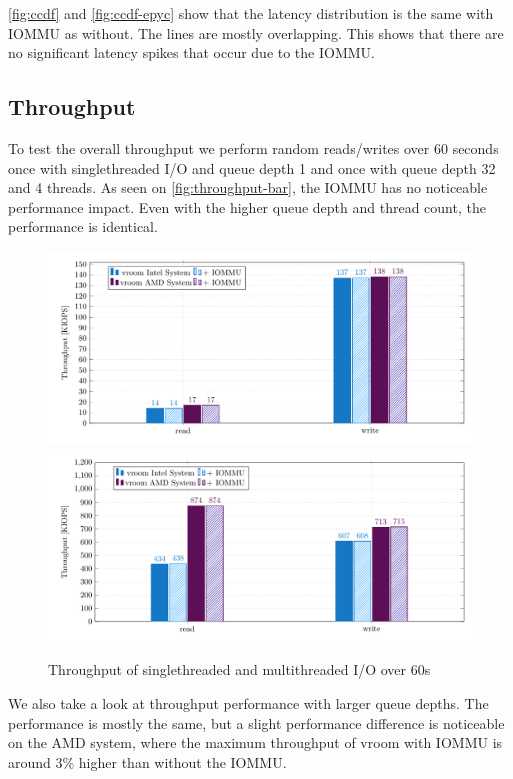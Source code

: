 \autoref{fig:ccdf} and \autoref{fig:ccdf-epyc} show that the latency distribution is the same with IOMMU as without. The lines are mostly overlapping. This shows that there are no significant latency spikes that occur due to the IOMMU.

\subsection{Throughput}
To test the overall throughput we perform random reads/writes over 60 seconds once with singlethreaded I/O and queue depth 1 and once with queue depth 32 and 4 threads. As seen on \autoref{fig:throughput-bar}, the IOMMU has no noticeable performance impact. Even with the higher queue depth and thread count, the performance is identical.

\begin{figure}[H]
  \centering
   {\includegraphics[width=.9\textwidth]{figures/throughput_bar_qd1t1} \label{fig:throughput-qd1t1}}
   {\includegraphics[width=.9\textwidth]{figures/throughput_bar_qd32t4} \label{fig:throughput-qd32t4}}
  \caption{Throughput of singlethreaded and multithreaded I/O over 60s}
  \label{fig:throughput-bar}
\end{figure}

We also take a look at throughput performance with larger queue depths. The performance is mostly the same, but a slight performance difference is noticeable on the AMD system, where the maximum throughput of vroom with IOMMU is around 3\% higher than without the IOMMU.

